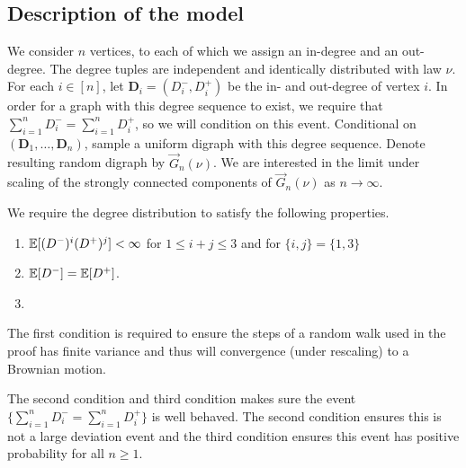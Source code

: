 \subsection{Description of the model}

We consider $n$ vertices, to each of which we assign an in-degree and an out-degree. The degree tuples are independent and identically distributed with law $\nu$. For each $i\in [n]$, let $\mathbf{D}_i=(D^-_i,D^+_i)$ be the in- and out-degree of vertex $i$. In order for a graph with this degree sequence to exist, we require that $\sum_{i=1}^n D^-_i=\sum_{i=1}^n D^+_i$, so we will condition on this event. Conditional on $(\mathbf{D}_1,\dots,\mathbf{D}_n)$, sample a uniform digraph with this degree sequence. Denote resulting random digraph by $\vec{G}_n(\nu)$. We are interested in the limit under scaling of the strongly connected components of $\vec{G}_n(\nu)$ as $n\to \infty$.

We require the degree distribution to satisfy the following properties.

\begin{enumerate}
    \item ${\mathbb E}[(D^-)^i(D^+)^j]< \infty$ for $1 \leq i+j\leq 3$ and for $\{i,j\}=\{1,3\}$
    \item ${\mathbb E}[D^-] = {\mathbb E}[D^+]$.
    \item {}
\end{enumerate}

The first condition is required to ensure the steps of a random walk used in the proof has finite variance and thus will convergence (under rescaling) to a Brownian motion.

The second condition and third condition makes sure the event $\{\sum_{i=1}^n D^-_i = \sum_{i=1}^n D^+_i\}$ is well behaved. The second condition ensures this is not a large deviation event and the third condition ensures this event has positive probability for all $n \geq 1$. 


